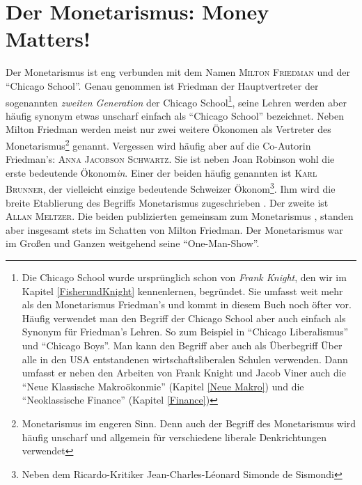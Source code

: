 %
%
%

\chapter{Der Monetarismus: Money Matters!}
\label{Monetarismus}

Der Monetarismus ist eng verbunden mit dem Namen \textsc{Milton Friedman} und der "`Chicago School"'. Genau genommen ist Friedman der Hauptvertreter der sogenannten \textit{zweiten Generation} der Chicago School\footnote{Die Chicago School wurde ursprünglich schon von \textit{Frank Knight}, den wir im Kapitel \ref{FisherundKnight} kennenlernen, begründet. Sie umfasst weit mehr als den Monetarismus Friedman's und kommt in diesem Buch noch öfter vor. Häufig verwendet man den Begriff der Chicago School aber auch einfach als Synonym für Friedman's Lehren. So zum Beispiel in "`Chicago Liberalismus"' und "`Chicago Boys"'. Man kann den Begriff aber auch als Überbegriff Über alle in den USA entstandenen wirtschaftsliberalen Schulen verwenden. Dann umfasst er neben den Arbeiten von Frank Knight und Jacob Viner auch die "`Neue Klassische Makroökonmie"' (Kapitel \ref{Neue Makro}) und die "`Neoklassische Finance"' (Kapitel \ref{Finance})}, seine Lehren werden aber häufig synonym etwas unscharf einfach als "`Chicago School"' bezeichnet. Neben Milton Friedman werden meist nur zwei weitere Ökonomen als Vertreter des Monetarismus\footnote{Monetarismus im engeren Sinn. Denn auch der Begriff des Monetarismus wird häufig unscharf und allgemein für verschiedene liberale Denkrichtungen verwendet} genannt. Vergessen wird häufig aber auf die Co-Autorin Friedman's: \textsc{Anna Jacobson Schwartz}. Sie ist neben Joan Robinson wohl die erste bedeutende Ökonom\textit{in}. Einer der beiden häufig genannten ist \textsc{Karl Brunner}, der vielleicht einzige bedeutende Schweizer Ökonom\footnote{Neben dem Ricardo-Kritiker Jean-Charles-Léonard Simonde de Sismondi}. Ihm wird die breite Etablierung des Begriffs Monetarismus zugeschrieben \parencite{Pierenkemper2012, Brunner1968}. Der zweite ist \textsc{Allan Meltzer}. Die beiden publizierten gemeinsam zum Monetarismus \parencite{Meltzer1971}, standen aber insgesamt stets im Schatten von Milton Friedman. Der Monetarismus war im Großen und Ganzen weitgehend seine "`One-Man-Show"'. 

